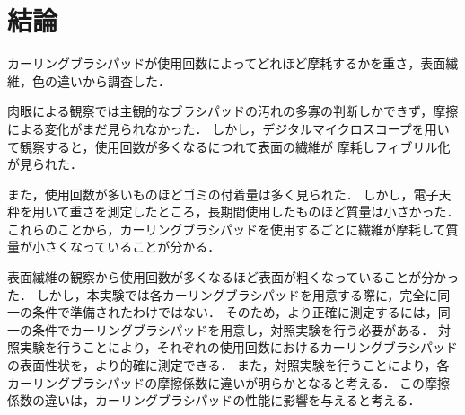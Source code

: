 \documentclass[main]{subfiles}
\begin{document}
\chapter{結論}
カーリングブラシパッドが使用回数によってどれほど摩耗するかを重さ，表面繊維，色の違いから調査した．

肉眼による観察では主観的なブラシパッドの汚れの多寡の判断しかできず，摩擦による変化がまだ見られなかった．
しかし，デジタルマイクロスコープを用いて観察すると，使用回数が多くなるにつれて表面の繊維が
摩耗しフィブリル化が見られた．

また，使用回数が多いものほどゴミの付着量は多く見られた．
しかし，電子天秤を用いて重さを測定したところ，長期間使用したものほど質量は小さかった．
これらのことから，カーリングブラシパッドを使用するごとに繊維が摩耗して質量が小さくなっていることが分かる．

表面繊維の観察から使用回数が多くなるほど表面が粗くなっていることが分かった．
しかし，本実験では各カーリングブラシパッドを用意する際に，完全に同一の条件で準備されたわけではない．
そのため，より正確に測定するには，同一の条件でカーリングブラシパッドを用意し，対照実験を行う必要がある．
対照実験を行うことにより，それぞれの使用回数におけるカーリングブラシパッドの表面性状を，より的確に測定できる．
また，対照実験を行うことにより，各カーリングブラシパッドの摩擦係数に違いが明らかとなると考える．
この摩擦係数の違いは，カーリングブラシパッドの性能に影響を与えると考える．
\end{document}

